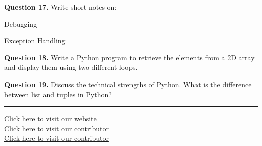 \documentclass[11pt,a4paper]{article}
\begin{document}
\medskip


\noindent   \textbf{Question 17.} Write short notes on:

\begin{parts}
  \item Debugging
  \item Exception Handling
\end{parts}

\medskip


\noindent   \textbf{Question 18.} Write a Python program to retrieve the elements from a 2D array and display them using two different loops.

\medskip


\noindent   \textbf{Question 19.} Discuss the technical strengths of Python. What is the difference between list and tuples in Python?

\vfill
\rule{\linewidth}{0.4pt}

\begin{center}\small
\href{https://bhu-exam.vercel.app/}{Click here to visit our website}\\[4pt]\href{https://me-aryan.vercel.app/}{Click here to visit our contributor}\\[4pt]\href{https://quashan-me.vercel.app/}{Click here to visit our contributor}
\end{center}
\end{document}
